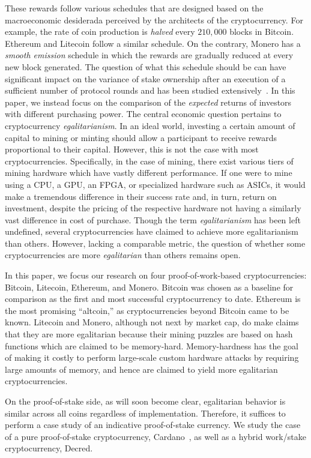 These rewards follow various schedules that are designed based on the
macroeconomic desiderada perceived by the architects of the cryptocurrency. For
example, the rate of coin production is \emph{halved} every $210,000$ blocks in
Bitcoin. Ethereum and Litecoin follow a similar schedule. On the contrary,
Monero has a \emph{smooth emission} schedule in which the rewards are gradually
reduced at every new block generated. The question of what this schedule should
be can have significant impact on the variance of stake ownership after an
execution of a sufficient number of protocol rounds and has been studied
extensively~\cite{equitability}. In this paper, we instead focus on the
comparison of the \emph{expected} returns of investors with different purchasing
power. The central economic question pertains to cryptocurrency \emph{egalitarianism}.
In an ideal world, investing a certain amount of capital to mining or minting
should allow a participant to receive rewards proportional to their capital.
However, this is not the case with most cryptocurrencies. Specifically, in
the case of mining, there exist various tiers of mining hardware which have
vastly different performance. If one were to mine using a CPU, a GPU, an FPGA,
or specialized hardware such as ASICs, it would make a tremendous difference in
their success rate and, in turn, return on investment, despite the pricing of
the respective hardware not having a similarly vast difference in cost of
purchase. Though the term \emph{egalitarianism} has been left undefined, several
cryptocurrencies have claimed to achieve more egalitarianism than others.
However, lacking a comparable metric, the question of whether some
cryptocurrencies are more \emph{egalitarian} than others remains open.

In this paper, we focus our research on four proof-of-work-based
cryptocurrencies: Bitcoin, Litecoin, Ethereum, and Monero. Bitcoin was chosen as
a baseline for comparison as the first and most successful cryptocurrency to
date. Ethereum is the most promising ``altcoin,'' as cryptocurrencies beyond
Bitcoin came to be known. Litecoin and Monero, although not next by market cap,
do make claims that they are more egalitarian because their mining puzzles are
based on hash functions which are claimed to be memory-hard. Memory-hardness
has the goal of making it costly to perform large-scale custom hardware attacks
by requiring large amounts of memory, and hence are claimed to yield more
egalitarian cryptocurrencies.

On the proof-of-stake side, as will soon become clear, egalitarian behavior is
similar across all coins regardless of implementation. Therefore, it suffices to
perform a case study of an indicative proof-of-stake currency. We study the case of a
pure proof-of-stake cryptocurrency, Cardano~\cite{C:KRDO17}, as well as a hybrid
work/stake cryptocurrency, Decred.

